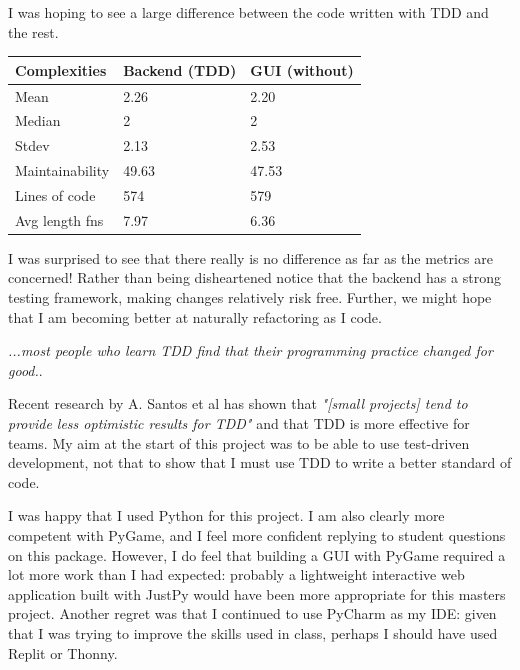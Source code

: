 \documentclass[10pt]{article}
\begin{document}
I was hoping to see a large difference between the code written with TDD and the rest.
\begin{center}
\begin{tabular}{|l|l|l|}
\hline
Complexities      & \textbf{Backend (TDD)} & \textbf{GUI (without)} \\ \hline
Mean            & 2.26         & 2.20             \\ \hline
Median          & 2            & 2                \\ \hline
Stdev           & 2.13         & 2.53             \\ \hline \hline
Maintainability & 49.63        & 47.53            \\ \hline
Lines of code   & 574          & 579              \\ \hline
Avg length fns     & 7.97         & 6.36             \\ \hline
\end{tabular}
\end{center}
I was surprised to see that there really is no difference as far as the metrics are concerned! Rather than being disheartened notice that the backend has a strong testing framework, making changes relatively risk free. Further, we might hope that I am becoming better at naturally refactoring as I code. 
\begin{center}
\emph{...most people who learn TDD find that their programming practice changed for good.}\cite[p.xii]{Beck03}.
\end{center}
Recent research by A. Santos et al has shown that \emph{"[small projects] tend to provide less optimistic results for TDD"} and that TDD is more effective for teams.\cite{SVDU21} My aim at the start of this project was to be able to use test-driven development, not that to show that I must use TDD to write a better standard of code.

I was happy that I used Python for this project. I am also clearly more competent with PyGame, and I feel more confident replying to student questions on this package. However, I do feel that building a GUI with PyGame required a lot more work than I had expected: probably a lightweight interactive web application built with JustPy would have been more appropriate for this masters project. Another regret was that I continued to use PyCharm as my IDE: given that I was trying to improve the skills used in class, perhaps I should have used Replit or Thonny.

\
\end{document}
